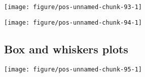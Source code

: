 \documentclass[paper=a4,10pt,div=17,headsepline,BCOR=12mm,twoside,open=right]{scrbook}\usepackage{knitr}
\begin{document}
\begin{knitrout}\footnotesize
{}\color{fgcolor}\begin{kframe}
\begin{alltt}
    \hlopt{+}
  \hlstd{(} \hlstd{=} \hlstd{)}
\end{alltt}
\end{kframe}

{\centering \texttt{[image: figure/pos-unnamed-chunk-93-1]} 

}



\end{knitrout}

\begin{knitrout}\footnotesize
{}\color{fgcolor}\begin{kframe}
\begin{alltt}
    \hlopt{+}
  \hlstd{()} \hlopt{+}
  \hlstd{()} \hlopt{+}
  \hlstd{()}
\end{alltt}
\end{kframe}

{\centering \texttt{[image: figure/pos-unnamed-chunk-94-1]} 

}



\end{knitrout}

\subsection{Box and whiskers plots}

\begin{knitrout}\footnotesize
{}\color{fgcolor}\begin{kframe}
\begin{alltt}
  \hlopt{+}
  \hlstd{()}
\end{alltt}
\end{kframe}

{\centering \texttt{[image: figure/pos-unnamed-chunk-95-1]} 

}



\end{knitrout}
\end{document}
